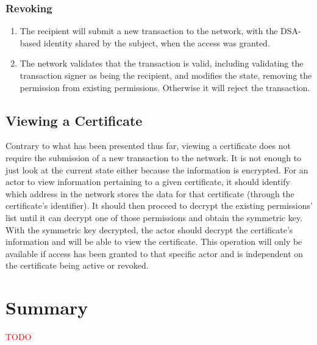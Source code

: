 \subsubsection{Revoking}

\begin{enumerate}
    \item The recipient will submit a new transaction to the network, with the DSA-based identity shared by the subject, when the access was granted.
    \item The network validates that the transaction is valid, including validating the transaction signer as being the recipient, and modifies the state, removing the permission from existing permissions. Otherwise it will reject the transaction.
\end{enumerate}

\subsection{Viewing a Certificate}

Contrary to what has been presented thus far, viewing a certificate does not require the submission of a new transaction to the network. It is not enough to just look at the current state either because the information is encrypted. For an actor to view information pertaining to a given certificate, it should identify which address in the network stores the data for that certificate (through the certificate's identifier). It should then proceed to decrypt the existing permissions' list until it can decrypt one of those permissions and obtain the symmetric key. With the symmetric key decrypted, the actor should decrypt the certificate's information and will be able to view the certificate. This operation will only be available if access has been granted to that specific actor and is independent on the certificate being active or revoked.

\section{Summary}

\textcolor{red}{TODO}